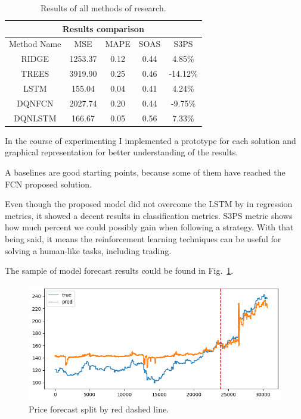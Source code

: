 \documentclass{article}
\begin{document}
\begin{table}[tbh!]
\begin{center}
\begin{tabular}{ |c||c|c|c|c|  }
 \hline
 \multicolumn{5}{|c|}{Results comparison} \\
 \hline
 Method Name & MSE & MAPE & SOAS & S3PS \\
 \hline
 \hline
 RIDGE & 1253.37 & 0.12 & 0.44 & 4.85\% \\
 \hline
 TREES & 3919.90 & 0.25 & 0.46 & -14.12\% \\
 \hline
 LSTM & 155.04 & 0.04 & 0.41 & 4.24\% \\
 \hline
 DQNFCN & 2027.74 & 0.20 & 0.44 & -9.75\% \\
 \hline
 DQNLSTM & 166.67 & 0.05 & 0.56 &  7.33\% \\
 \hline
\end{tabular}
\caption{Results of all methods of research.}
\label{tab:results}
\end{center}
\end{table}

In the course of experimenting I implemented a prototype for each solution and graphical representation for better understanding of the results.

A baselines are good starting points, because some of them have reached the FCN proposed solution.

Even though the proposed model did not overcome the LSTM by \cite{Sen_2021} in regression metrics, it showed a decent results in classification metrics.
S3PS metric shows how much percent we could possibly gain when following a strategy. 
With that being said, it means the reinforcement learning techniques can be useful for solving a human-like tasks, including trading.

The sample of model forecast results could be found in Fig.~\ref{fig:forecasts}.

\begin{figure}[!tbh]
    \centering
    \includegraphics[width=0.9\linewidth]{forecasts.png}
    \caption{Price forecast split by red dashed line.}
    \label{fig:forecasts}
\end{figure}
\end{document}
